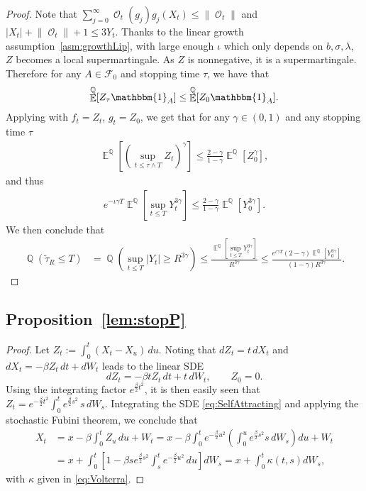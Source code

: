 \documentclass[11pt]{article}
\numberwithin{equation}{section}
\theoremstyle{plain}
\theoremstyle{definition}
\DeclareMathOperator{\E}{\mathbb{E}}
\DeclareMathOperator{\Q}{\mathbb{Q}}
\DeclareMathOperator{\calO}{\mathcal{O}}
\begin{document}
\begin{proof}
 Note that $\sum_{j=0}^{\infty} \calO_t(g_j) g_j(X_t) \leq \lVert \calO_t \rVert$ and $|X_t|+\lVert \calO_t \rVert+1 \leq 3Y_t$. Thanks to the linear growth assumption~\ref{asm:growthLip}, with large enough $\iota$ which only depends on $b,\sigma, \lambda$,  $Z$ becomes a local supermartingale. As $Z$ is nonnegative, it is a supermartingale. Therefore for any $A \in \mathcal{F}_0$ and stopping time $\tau$, we have that 
 \begin{align*}
     \E^{\Q}[ Z_{\tau} \mathbbm{1}_A] \leq \E^{\Q}[ Z_0 \mathbbm{1}_A]. 
 \end{align*}
 Applying \cite[Lemma 3.2]{GyKr03} with $f_t=Z_t$, $g_t=Z_0$, we get that for any $\gamma \in (0,1)$ and any stopping time $ \tau $
\begin{align*}
    \E^{\Q} \left[ \left(\sup_{t \leq \tau \wedge T} Z_t\right)^{\gamma}\right] \leq \frac{2-\gamma}{1-\gamma} \E^{\Q}[Z_0^{\gamma} ],
\end{align*}
and thus 
\begin{align*}
    e^{-\iota \gamma T} \E^{\Q} \left[ \sup_{t \leq  T} Y_t^{3 \gamma} \right]\leq \frac{2-\gamma}{1-\gamma} \E^{\Q}[Y_0^{3\gamma} ].  
\end{align*}
We then conclude that 
\begin{align*}
    \Q (\tilde\tau_R \leq T ) &=\Q \left( \sup_{t \leq T} |Y_t|  \geq R^{3 \gamma} \right)  \leq \frac{ \E^{\Q} \left[ \sup_{t \leq  T} Y_t^{3\gamma} \right]}{ R^{3\gamma}} \leq \frac{ e^{\iota \gamma T} (2-\gamma) \E^{\Q}[Y_0^{3\gamma}]}{(1-\gamma)R^{3 \gamma} }.
\end{align*}
\end{proof}


\subsection{Proposition~\ref{lem:stopP}} \label{app:Volterra}
\begin{proof}
    Let 
$Z_t := \int_0^t (X_t - X_u)\,du$. Noting that  $dZ_t = t\,dX_t$ and $dX_t = - \beta Z_t\,dt +  dW_t $ leads to the linear SDE
\[
dZ_t  = -\beta t Z_t\,dt + t\,dW_t, \qquad Z_0 = 0 .
\]
Using the integrating factor $e^{\frac{\beta}{2}t^2}$, it is then easily seen that 
$
Z_t
= e^{-\frac{\beta}{2}t^2} \int_0^t e^{\frac{\beta}{2}s^2}\, s \, dW_s.$
Integrating the  SDE \eqref{eq:SelfAttracting} and applying the stochastic Fubini theorem, we conclude that 
\begin{align*}
    X_t &= x  - \beta \int_0^t Z_u\,du + W_t  
  = x -\beta \int_0^t e^{-\frac{\beta}{2}u^2}
 \left( \int_0^u e^{\frac{\beta}{2}s^2} s\, dW_s \right) du + W_t \\[0.5em] 
&= x + \int_0^t 
\left[ 1- \beta s 
e^{\frac{\beta}{2}s^2} \int_s^t e^{-\frac{\beta}{2}u^2}\,du
\right] dW_s
= x + \int_0^t \kappa(t,s)dW_s,
\end{align*}
with $\kappa$ given in \eqref{eq:Volterra}.
\end{proof}


\end{document}
